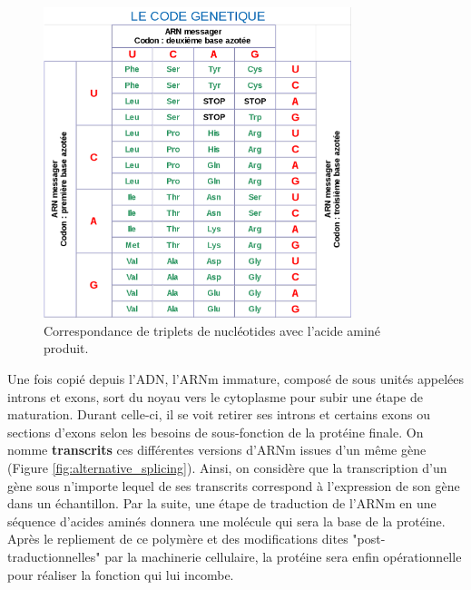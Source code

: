 \begin{figure}[!ht]
    \centering
    \includegraphics[width=0.8\textwidth]{img/intro/code_genetique.png}
    \caption{Correspondance de triplets de nucléotides avec l'acide aminé produit.}
    \label{fig:intro_code_genetique}
\end{figure}


Une fois copié depuis l'ADN, l'ARNm immature, composé de sous unités appelées introns et exons, sort du noyau vers le cytoplasme pour subir une étape de maturation. Durant celle-ci, il se voit retirer ses introns et certains exons ou sections d'exons selon les besoins de sous-fonction de la protéine finale. On nomme \textbf{transcrits} ces différentes versions d'ARNm issues d'un même gène (Figure \ref{fig:alternative_splicing}). Ainsi, on considère que la transcription d'un gène sous n'importe lequel de ses transcrits correspond à l'expression de son gène dans un échantillon. Par la suite, une étape de traduction de l'ARNm en une séquence d'acides aminés donnera une molécule qui sera la base de la protéine. Après le repliement de ce polymère et des modifications dites "post-traductionnelles" par la machinerie cellulaire, la protéine sera enfin opérationnelle pour réaliser la fonction qui lui incombe. 

